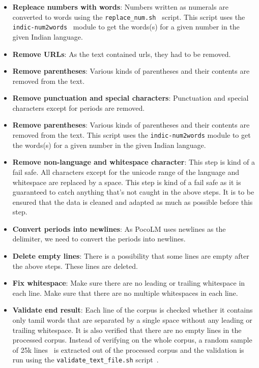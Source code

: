 \documentclass[11pt]{article} \usepackage{spconf,amsmath,graphicx}
\begin{document}
\begin{itemize}
	\item \textbf{Repleace numbers with words}: Numbers written as numerals are converted to words using the \texttt{replace\_num.sh}~\cite{num2wordsscript} script.
	This script uses the \texttt{indic-num2words}~\cite{num2wordsscript} module to get the words(s) for a given number in the given Indian language.
	\item \textbf{Remove URLs}: As the text contained urls, they had to be removed.
	\item \textbf{Remove parentheses}: Various kinds of parentheses and their contents are removed from the text.
	\item \textbf{Remove punctuation and special characters}: Punctuation and special characters except for periods are removed.
	\item \textbf{Remove parentheses}: Various kinds of parentheses and their contents are removed from the text.
	This script uses the \texttt{indic-num2words} module to get the words(s) for a given number in the given Indian language.
	\item \textbf{Remove non-language and whitespace character}: This step is kind of a fail safe. All characters except for the unicode range of the language and whitespace are replaced by a space.
	This step is kind of a fail safe as it is guaranteed to catch anything that's not caught in the above steps. It is to be ensured that the data is cleaned and adapted
	as much as possible before this step. 
	\item \textbf{Convert periods into newlines}: As PocoLM uses newlines as the delimiter, we need to convert the periods into newlines.
	\item \textbf{Delete empty lines}: There is a possibility that some lines are empty after the above steps. These lines are deleted.
	\item \textbf{Fix whitespace}: Make sure there are no leading or trailing whitespace in each line. Make sure that there are no multiple whitespaces in each line.
	\item \textbf{Validate end result}: Each line of the corpus is checked whether it contains only tamil words that are separated by a single space without any leading or trailing whitespace.
	It is also verified that there are no empty lines in the processed corpus. Instead of verifying on the whole corpus, a random sample of 25k lines~\cite{randnsample} is extracted out of the processed corpus and the
	validation is run using the \texttt{validate\_text\_file.sh} script~\cite{validatecorpus}.
\end{itemize}
\end{document}
